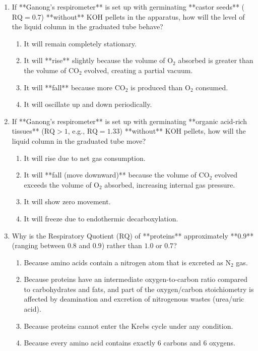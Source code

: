 \documentclass[11pt, a4paper]{article}
\begin{document}
\begin{enumerate}[label=\textbf{\arabic*.}]
\item If **Ganong's respirometer** is set up with germinating **castor seeds** ($\text{RQ} = 0.7$) **without** $\text{KOH}$ pellets in the apparatus, how will the level of the liquid column in the graduated tube behave?
\begin{enumerate}[label=(\Alph*)]
    \item It will remain completely stationary.
    \item It will **rise** slightly because the volume of $\text{O}_2$ absorbed is greater than the volume of $\text{CO}_2$ evolved, creating a partial vacuum.
    \item It will **fall** because more $\text{CO}_2$ is produced than $\text{O}_2$ consumed.
    \item It will oscillate up and down periodically.
\end{enumerate}

\item If **Ganong's respirometer** is set up with germinating **organic acid-rich tissues** ($\text{RQ} > 1$, e.g., $\text{RQ} = 1.33$) **without** $\text{KOH}$ pellets, how will the liquid column in the graduated tube move?
\begin{enumerate}[label=(\Alph*)]
    \item It will rise due to net gas consumption.
    \item It will **fall (move downward)** because the volume of $\text{CO}_2$ evolved exceeds the volume of $\text{O}_2$ absorbed, increasing internal gas pressure.
    \item It will show zero movement.
    \item It will freeze due to endothermic decarboxylation.
\end{enumerate}

\item Why is the Respiratory Quotient ($\text{RQ}$) of **proteins** approximately **$0.9$** (ranging between $0.8$ and $0.9$) rather than $1.0$ or $0.7$?
\begin{enumerate}[label=(\Alph*)]
    \item Because amino acids contain a nitrogen atom that is excreted as $\text{N}_2$ gas.
    \item Because proteins have an intermediate oxygen-to-carbon ratio compared to carbohydrates and fats, and part of the oxygen/carbon stoichiometry is affected by deamination and excretion of nitrogenous wastes (urea/uric acid).
    \item Because proteins cannot enter the Krebs cycle under any condition.
    \item Because every amino acid contains exactly $6$ carbons and $6$ oxygens.
\end{enumerate}


\end{enumerate}
\end{document}
